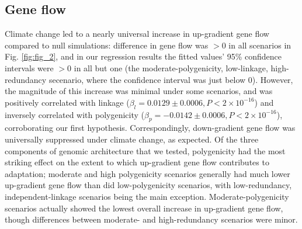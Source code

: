 \documentclass[9pt,twocolumn,twoside,lineno]{pnas-new}
\begin{document}
\subsection{Gene flow}
Climate change led to a nearly universal increase in up-gradient gene flow
compared to null simulations: difference in gene flow was $>0$ in all scenarios
in Fig. \ref{fig:fig_2}, and in our regression
results the fitted values' 95\% confidence intervals were $>0$ in all but
one (the moderate-polygenicity, low-linkage, high-redundancy secenario, where the confidence interval was just below 0).
However, the magnitude of this increase was minimal under
some scenarios, and was positively correlated with linkage
($\beta_{l} = 0.0129\pm0.0006, P<2\times10^{-16}$)
and inversely correlated with polygenicity
($\beta_{p} = -0.0142\pm0.0006, P<2\times10^{-16}$),
corroborating our first hypothesis.
Correspondingly, down-gradient gene flow was 
universally suppressed under climate change, as expected.
Of the three components of genomic architecture that we tested,
polygenicity had the most striking effect on the extent to which
up-gradient gene flow contributes to adaptation;
moderate and high polygenicity scenarios generally had much lower
up-gradient gene flow than did low-polygenicity scenarios,
with low-redundancy, independent-linkage scenarios being the main exception.
Moderate-polygenicity scenarios actually showed the lowest overall increase
in up-gradient gene flow, though differences between moderate- and
high-redundancy scenarios were minor.
\end{document}
